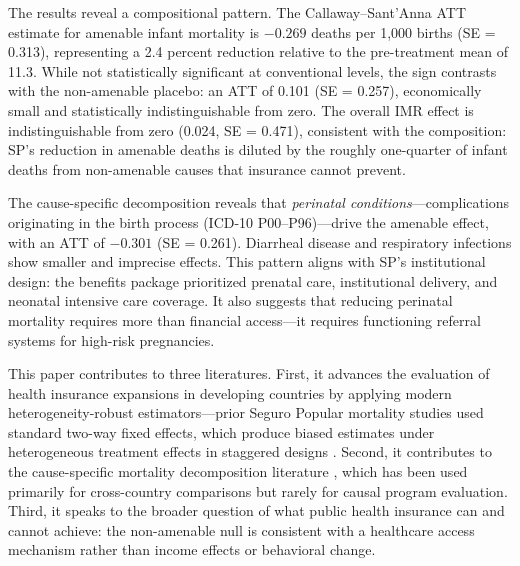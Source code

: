 \documentclass[12pt]{article}
\begin{document}
The results reveal a compositional pattern. The Callaway--Sant'Anna ATT estimate for amenable infant mortality is $-0.269$ deaths per 1,000 births (SE = 0.313), representing a 2.4 percent reduction relative to the pre-treatment mean of 11.3. While not statistically significant at conventional levels, the sign contrasts with the non-amenable placebo: an ATT of 0.101 (SE = 0.257), economically small and statistically indistinguishable from zero. The overall IMR effect is indistinguishable from zero (0.024, SE = 0.471), consistent with the composition: SP's reduction in amenable deaths is diluted by the roughly one-quarter of infant deaths from non-amenable causes that insurance cannot prevent.

The cause-specific decomposition reveals that \textit{perinatal conditions}---complications originating in the birth process (ICD-10 P00--P96)---drive the amenable effect, with an ATT of $-0.301$ (SE = 0.261). Diarrheal disease and respiratory infections show smaller and imprecise effects. This pattern aligns with SP's institutional design: the benefits package prioritized prenatal care, institutional delivery, and neonatal intensive care coverage. It also suggests that reducing perinatal mortality requires more than financial access---it requires functioning referral systems for high-risk pregnancies.

This paper contributes to three literatures. First, it advances the evaluation of health insurance expansions in developing countries \citep{levy2008, king2009, sosa2009, pfutze2014, barham2011, gruber2014} by applying modern heterogeneity-robust estimators---prior Seguro Popular mortality studies used standard two-way fixed effects, which produce biased estimates under heterogeneous treatment effects in staggered designs \citep{goodmanbacon2021, dechaisemartin2020}. Second, it contributes to the cause-specific mortality decomposition literature \citep{nolte2004, tobias2017, rutstein1983}, which has been used primarily for cross-country comparisons but rarely for causal program evaluation. Third, it speaks to the broader question of what public health insurance can and cannot achieve: the non-amenable null is consistent with a healthcare access mechanism rather than income effects or behavioral change.
\end{document}
